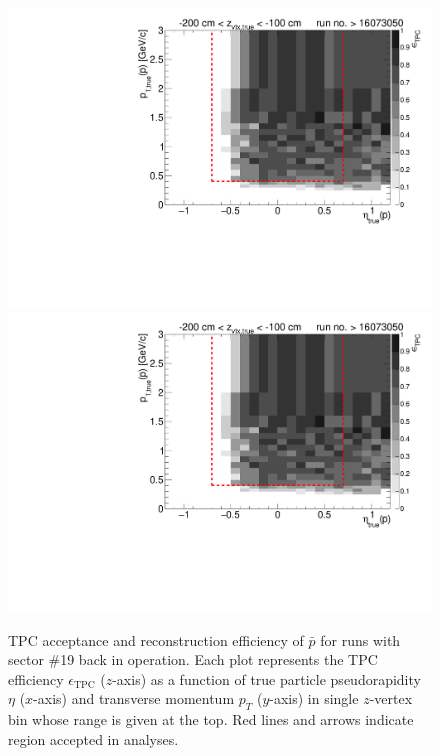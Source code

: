 \begin{figure}[hb]
	\caption[TPC acceptance and reconstruction efficiency of $\bar{p}$ for runs with sector \#19 back in operation.]{TPC acceptance and reconstruction efficiency of $\bar{p}$ for runs with sector \#19 back in operation. Each plot represents the TPC efficiency $\epsilon_{\text{TPC}}$ ($z$-axis) as a function of true particle pseudorapidity $\eta$ ($x$-axis) and transverse momentum $p_{T}$ ($y$-axis) in single $z$-vertex bin whose range is given at the top. Red lines and arrows indicate region accepted in analyses.}\label{fig:tpcEff_proton_minus1}
	\centering
	\parbox{0.495\textwidth}{
		\centering
		\includegraphics[width=\linewidth,page=3]{graphics/eff/Eff2D_TPC_proton_Minus_RunRange2.pdf}\\
		\includegraphics[width=\linewidth,page=5]{graphics/eff/Eff2D_TPC_proton_Minus_RunRange2.pdf}\\
}
\end{figure}
